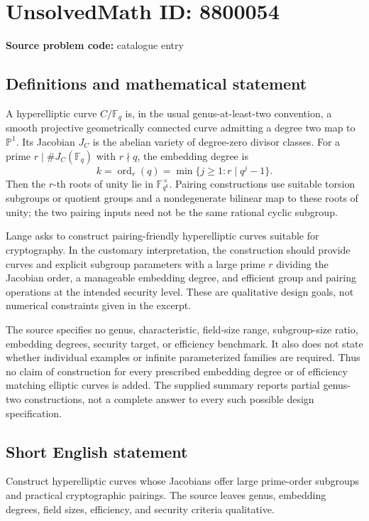 \documentclass[11pt]{article}
\newcommand{\F}{\mathbb{F}}
\begin{document}
\section*{UnsolvedMath ID: 8800054}
\textbf{Source problem code:} catalogue entry
\subsection{Definitions and mathematical statement}
A hyperelliptic curve \(C/\F_q\) is, in the usual genus-at-least-two convention, a smooth projective geometrically connected curve admitting a degree two map to \(\mathbb P^1\). Its Jacobian \(J_C\) is the abelian variety of degree-zero divisor classes. For a prime \(r\mid\#J_C(\F_q)\) with \(r\nmid q\), the embedding degree is
\[
 k=\operatorname{ord}_r(q)=\min\{j\geq1:r\mid q^j-1\}.
\]
Then the \(r\)-th roots of unity lie in \(\F_{q^k}^{\times}\). Pairing constructions use suitable torsion subgroups or quotient groups and a nondegenerate bilinear map to these roots of unity; the two pairing inputs need not be the same rational cyclic subgroup.

Lange asks to construct pairing-friendly hyperelliptic curves suitable for cryptography. In the customary interpretation, the construction should provide curves and explicit subgroup parameters with a large prime \(r\) dividing the Jacobian order, a manageable embedding degree, and efficient group and pairing operations at the intended security level. These are qualitative design goals, not numerical constraints given in the excerpt.

The source specifies no genus, characteristic, field-size range, subgroup-size ratio, embedding degrees, security target, or efficiency benchmark. It also does not state whether individual examples or infinite parameterized families are required. Thus no claim of construction for every prescribed embedding degree or of efficiency matching elliptic curves is added. The supplied summary reports partial genus-two constructions, not a complete answer to every such possible design specification.
\subsection{Short English statement}
Construct hyperelliptic curves whose Jacobians offer large prime-order subgroups and practical cryptographic pairings. The source leaves genus, embedding degrees, field sizes, efficiency, and security criteria qualitative.
\end{document}
